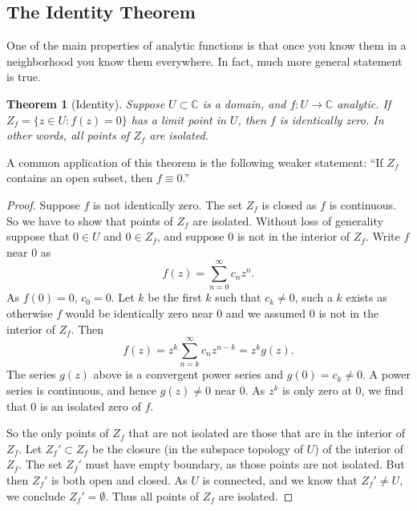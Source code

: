 \documentclass[12pt,openany]{book}
\newcommand{\C}{{\mathbb{C}}}
\theoremstyle{plain}
\newtheorem{thm}{Theorem}[section]
\theoremstyle{remark}
\theoremstyle{definition}
\theoremstyle{exercise}
\theoremstyle{example}
\begin{document}
\subsection{The Identity Theorem}

One of the main properties of analytic functions is that once you know them
in a neighborhood you know them everywhere.  In fact, much more general
statement is true.

\begin{thm}[Identity]
Suppose $U \subset \C$ is a domain, 
and $f \colon U \to \C$ analytic.  If $Z_f = \{ z \in U : f(z) = 0 \}$
has a limit point in $U$, then $f$ is identically zero.
In other words, all points of $Z_f$ are isolated.
\end{thm}

A common application of this theorem is the following weaker statement: ``If $Z_f$
contains an open subset, then $f \equiv 0$.''

\begin{proof}
Suppose $f$ is not identically zero.
The set $Z_f$ is closed as $f$ is continuous.  So we have to show
that points of $Z_f$ are isolated.
Without loss of generality suppose that $0 \in U$ and $0 \in Z_f$,
and suppose $0$ is not in the interior of $Z_f$.
Write $f$ near $0$ as
\begin{equation*}
f(z) = \sum_{n=0}^\infty c_n z^n .
\end{equation*}
As $f(0) = 0$, $c_0 =0$.  Let $k$ be the first $k$ such that $c_k \not=0$,
such a $k$ exists as otherwise $f$ would be identically zero near $0$
and we assumed $0$ is not in the interior of $Z_f$.  Then
\begin{equation*}
f(z) = z^k \sum_{n=k}^\infty c_n z^{n-k} = z^k g(z) .
\end{equation*}
The series $g(z)$ above is a convergent power series and $g(0) = c_k \not=
0$.  A power series is continuous, and hence $g(z) \not= 0$ near $0$.
As $z^k$ is only zero at $0$, we find that $0$ is an isolated zero of $f$.

So the only points of $Z_f$ that are not isolated are those that are in the
interior of $Z_f$.  Let $Z_f' \subset Z_f$ be the closure (in the subspace
topology of $U$)
of the interior of $Z_f$.
The set $Z_f'$ must have empty boundary, as those points are not isolated.
But then $Z_f'$ is both open and closed.  As $U$ is connected, and we know
that $Z_f' \not= U$, we conclude $Z_f' = \emptyset$.
Thus all points of $Z_f$ are isolated.
\end{proof}
\end{document}
